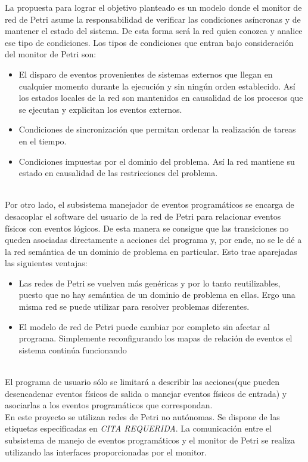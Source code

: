 La propuesta para lograr el objetivo planteado es un modelo donde el monitor de
red de Petri asume la responsabilidad de verificar las condiciones asíncronas y
de mantener el estado del sistema. De esta forma será la red quien conozca y
analice ese tipo de condiciones.
Los tipos de condiciones que entran bajo consideración del monitor de Petri son:
\begin{itemize}
\item El disparo de eventos provenientes de sistemas externos que llegan en cualquier momento
durante la ejecución y sin ningún orden establecido. Así los estados locales de la red son
mantenidos en causalidad de los procesos que se ejecutan y explicitan los eventos
externos.
\item Condiciones de sincronización que permitan ordenar la realización de tareas en el tiempo.
\item Condiciones impuestas por el dominio del problema. Así la red mantiene su estado en
causalidad de las restricciones del problema.
\end{itemize} \cite{chimp}
\\
Por otro lado, el subsistema manejador de eventos programáticos se encarga de
desacoplar el software del usuario de la red de Petri para relacionar eventos
físicos con eventos lógicos. De esta manera se consigue que las transiciones no
queden asociadas directamente a acciones del programa y, por ende, no se le dé
a la red semántica de un dominio de problema en particular.
Esto trae aparejadas las siguientes ventajas:
  \begin{itemize}
	\item Las redes de Petri se vuelven más genéricas y por lo tanto reutilizables,
    puesto que no hay semántica de un dominio de problema en ellas. Ergo una
    misma red se puede utilizar para resolver problemas diferentes.
	\item El modelo de red de Petri puede cambiar por completo sin afectar al
       programa.
 	Simplemente reconfigurando los mapas de relación de eventos el sistema
 	continúa funcionando
  \end{itemize} \cite{chimp}
\\

 El programa de usuario sólo se limitará a describir las acciones(que pueden
 desencadenar eventos físicos de salida o manejar eventos físicos de entrada)
 y asociarlas a los eventos programáticos que correspondan.
 \\

En este proyecto se utilizan redes de Petri no autónomas. Se dispone de las
etiquetas especificadas en \emph{\color{red} CITA REQUERIDA}. La comunicación
entre el subsistema de manejo de eventos programáticos y el monitor de Petri se
realiza utilizando las interfaces proporcionadas por el monitor.
